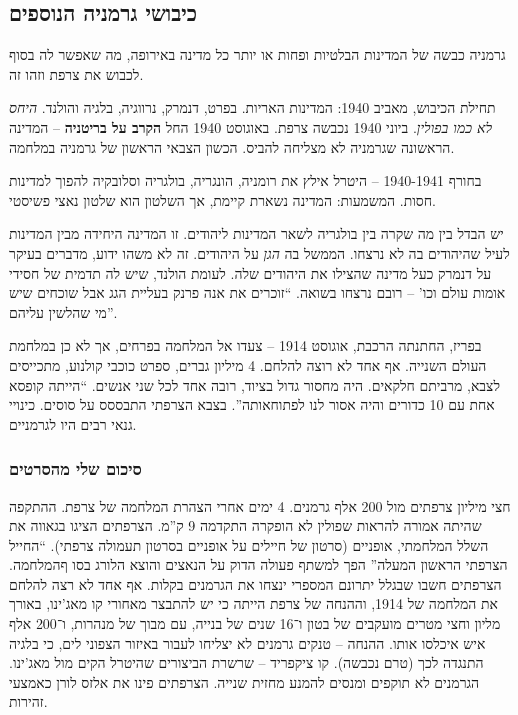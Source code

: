 \documentclass[]{article}
\begin{document}
   
   
   \subsection{כיבושי גרמניה הנוספים}
   
   גרמניה כבשה של המדינות הבלטיות ופחות או יותר כל מדינה באירופה, מה שאפשר לה בסוף לכבוש את צרפת וזהו זה. 
   
   תחילת הכיבוש, מאביב 1940: המדינות האריות. בפרט, דנמרק, נרווגיה, בלגיה והולנד. \textit{היחס לא כמו בפולין}. ביוני 1940 נכבשה צרפת. באוגוסט 1940 החל \textbf{הקרב על בריטניה} – המדינה הראשונה שגרמניה לא מצליחה להביס. הכשון הצבאי הראשון של גרמניה במלחמה. 
   
   בחורף 1940-1941 – היטרל אילץ את רומניה, הונגריה, בולגריה וסלובקיה להפוך למדינות חסות. המשמעות: המדינה נשארת קיימת, אך השלטון הוא שלטון נאצי פשיסטי. 
   
   יש הבדל בין מה שקרה בין בולגריה לשאר המדינות ליהודים. זו המדינה היחידה מבין המדינות לעיל שהיהודים בה לא נרצחו. הממשל בה \textit{הגן} על היהודים. זה לא משהו ידוע, מדברים בעיקר על דנמרק כעל מדינה שהצילו את היהודים שלה. לעומת הולנד, שיש לה תדמית של חסידי אומות עולם וכו' – רובם נרצחו בשואה. ``זוכרים את אנה פרנק בעליית הגג אבל שוכחים שיש מי שהלשין עליהם''. 
   
   בפריז, החתנתה הרכבת, אוגוסט 1914 – צעדו אל המלחמה בפרחים, אך לא כן במלחמת העולם השנייה. אף אחד לא רוצה להלחם. 4 מיליון גברים, ספרט כוכבי קולנוע, מתכייסים לצבא, מרביתם חלקאים. היה מחסור גדול בציוד, רובה אחד לכל שני אנשים. ``הייתה קופסא אחת עם 10 כדורים והיה אסור לנו לפתוחאותה''. בצבא הצרפתי התבססס על סוסים. כינויי גנאי רבים היו לגרמניים. 
   
   \subsubsection{סיכום שלי מהסרטים}
   
   חצי מיליון צרפתים מול 200 אלף גרמנים. 4 ימים אחרי הצהרת המלחמה של צרפת. ההתקפה שהיתה אמורה להראות שפולין לא הופקרה התקדמה 9 ק''מ. הצרפתים הציגו בגאווה את השלל המלחמתי, אופניים (סרטון של חיילים על אופניים בסרטון תעמולה צרפתי). ``החייל הצרפתי הראשון המעלה'' הפך למשתף פעולה הדוק על הנאצים והוצא הלורג בסו ףהמלחמה. הצרפתים חשבו שבגלל יתרונם המספרי ינצחו את הגרמנים בקלות. אף אחד לא רצה להלחם את המלחמה של 1914, וההנחה של צרפת הייתה כי יש להתבצר מאחורי קו מאג'ינו, באורך מליון וחצי מטרים מועקבים של בטון ו־16 שנים של בנייה, עם מבוך של מנהרות, ו־200 אלף איש איכלסו אותו. ההנחה – טנקים גרמנים לא יצליחו לעבור באיזור הצפוני לים, כי בלגיה התנגדה לכך (טרם נכבשה). קו ציקפריד – שרשרת הביצורים שהיטרל הקים מול מאג'ינו. הגרמנים לא תוקפים ומנסים להמנע מחזית שנייה. הצרפתים פינו את אלזס לורן כאמצעי זהירות. 
   
\end{document}
